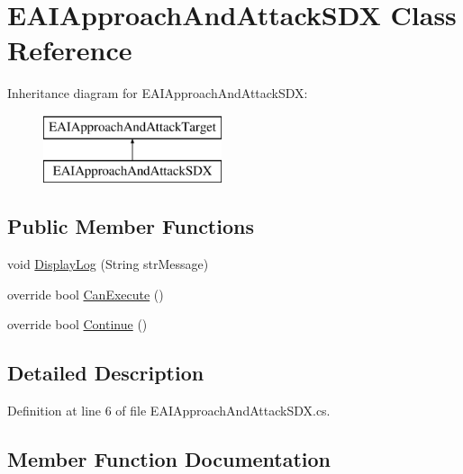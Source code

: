 \hypertarget{class_e_a_i_approach_and_attack_s_d_x}{}\section{E\+A\+I\+Approach\+And\+Attack\+S\+DX Class Reference}
\label{class_e_a_i_approach_and_attack_s_d_x}
Inheritance diagram for E\+A\+I\+Approach\+And\+Attack\+S\+DX\+:\begin{figure}[H]
\begin{center}
\leavevmode
\includegraphics[height=2.000000cm]{class_e_a_i_approach_and_attack_s_d_x}
\end{center}
\end{figure}
\subsection*{Public Member Functions}
\begin{DoxyCompactItemize}
\item 
void \mbox{\hyperlink{class_e_a_i_approach_and_attack_s_d_x_a873a0f9cf095c391535442e11cb9fc2c}{Display\+Log}} (String str\+Message)
\item 
override bool \mbox{\hyperlink{class_e_a_i_approach_and_attack_s_d_x_a335ae72728405fa39b43a1a425d19e75}{Can\+Execute}} ()
\item 
override bool \mbox{\hyperlink{class_e_a_i_approach_and_attack_s_d_x_a9f3130a32e9a3b52e6edd4c5d13ab5f2}{Continue}} ()
\end{DoxyCompactItemize}


\subsection{Detailed Description}


Definition at line 6 of file E\+A\+I\+Approach\+And\+Attack\+S\+D\+X.\+cs.



\subsection{Member Function Documentation}
\mbox{\label{class_e_a_i_approach_and_attack_s_d_x_a335ae72728405fa39b43a1a425d19e75}} 
